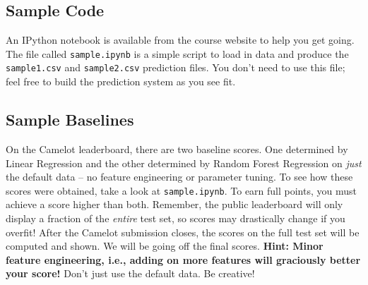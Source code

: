 \documentclass[12pt]{article}
\begin{document}
	\subsection*{Sample Code}
	An IPython notebook is available from the course website to help you get going.  The file called \verb|sample.ipynb| is a simple script to load in data and produce the \verb|sample1.csv| and \verb|sample2.csv| prediction files.  You don't need to use this file; feel free to build the prediction system as you see fit.
	
	\subsection*{Sample Baselines}
	On the Camelot leaderboard, there are two baseline scores.  One determined by Linear Regression and the other determined by Random Forest Regression on \textit{just} the default data -- no feature engineering or parameter tuning.  To see how these scores were obtained, take a look at \verb|sample.ipynb|.  To earn full points, you must achieve a score higher than both.  Remember, the public leaderboard will only display a fraction of the \textit{entire} test set, so scores may drastically change if you overfit!  After the Camelot submission closes, the scores on the full test set will be computed and shown.  We will be going off the final scores. 
	\textbf{Hint: Minor feature engineering, i.e., adding on more features will graciously better your score!}  Don't just use the default data.  Be creative!
	
\end{document}
